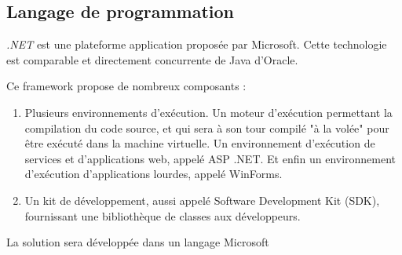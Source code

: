 
\subsection{Langage de programmation}

\textit{.NET} est une plateforme application proposée par Microsoft. Cette technologie est comparable et directement concurrente de Java d'Oracle.

Ce framework propose de nombreux composants :
\begin{enumerate}
\item Plusieurs environnements d'exécution. Un moteur d'exécution permettant la compilation du code source, et qui sera à son tour compilé "à la volée" pour être exécuté dans la machine virtuelle. Un environnement d'exécution de services et d'applications web, appelé ASP .NET. Et enfin un environnement d'exécution d'applications lourdes, appelé WinForms.
\item Un kit de développement, aussi appelé Software Development Kit (SDK), fournissant une bibliothèque de classes aux développeurs.
\end{enumerate}



La solution sera développée dans un langage Microsoft
